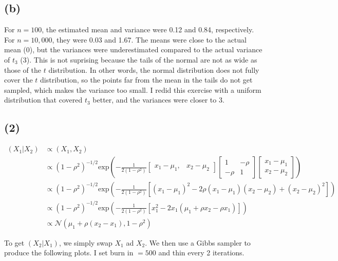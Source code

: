 \documentclass[11pt]{article}
\begin{document}
\subsection*{(b)}
For $n=100$, the estimated mean and variance were 0.12 and 0.84, respectively. For $n=10,000$, they were 0.03 and 1.67. The means were close to the actual mean (0), but the variances were underestimated compared to the actual variance of $t_3$ (3). This is not suprising because the tails of the normal are not as wide as those of the $t$ distribution. In other words, the normal distribution does not fully cover the $t$ distribution, so the points far from the mean in the tails do not get sampled, which makes the variance too small. I redid this exercise with a uniform distribution that  covered $t_3$ better, and the variances were closer to 3.

\subsection*{(2)}
\begin{align*}
    (X_1|X_2) & \propto (X_1, X_2)\\
    & \propto (1-\rho^2)^{-1/2}\text{exp} \left( -\frac{1}{2(1-\rho^2)} \begin{bmatrix} x_1-\mu_1, &x_2-\mu_2 \end{bmatrix} \begin{bmatrix} 1 & -\rho \\ -\rho & 1 \end{bmatrix}\begin{bmatrix} x_1-\mu_1 \\ x_2-\mu_2 \end{bmatrix}\right)\\
    & \propto (1-\rho^2)^{-1/2}\text{exp} \left( -\frac{1}{2(1-\rho^2)}[(x_1-\mu_1)^2-2\rho(x_1-\mu_1)(x_2-\mu_2) + (x_2-\mu_2)^2] \right)\\
     & \propto (1-\rho^2)^{-1/2}\text{exp} \left( -\frac{1}{2(1-\rho^2)}[x_1^2-2x_1(\mu_1+\rho x_2 - \rho x_1)] \right)\\
     & \propto \mathcal{N}(\mu_1 + \rho(x_2-x_1), 1-\rho^2)
\end{align*}

To get $(X_2|X_1)$, we simply swap $X_1$ ad $X_2$. We then use a Gibbs sampler to produce the following plots. I set burn in $=500$ and thin every 2 iterations.
\end{document}
